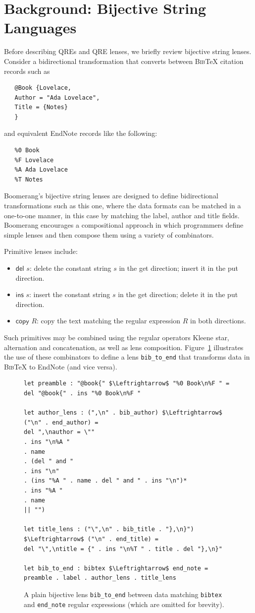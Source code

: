 \documentclass[acmsmall,screen]{acmart}
\newcommand{\kw}[1]{\textcolor{dkblue}{\ensuremath{\mathsf{#1}}}}
\newcommand{\bibtex}{\textsc{Bib}\TeX{}}
\newcommand{\cd}[1]{\lstinline[backgroundcolor=\color{white}]$#1$}
\begin{document}
\section{Background: Bijective String Languages}
\label{sec:background}
Before describing QREs and QRE lenses, we briefly review bijective
string lenses. Consider a bidirectional transformation that converts
between \bibtex{} citation records such as
\begin{verbatim}
   @Book {Lovelace,
   Author = "Ada Lovelace",
   Title = {Notes}
   }
\end{verbatim}
\noindent
and equivalent EndNote records like the following:
\begin{verbatim}
   %0 Book
   %F Lovelace
   %A Ada Lovelace
   %T Notes
\end{verbatim}
\noindent
Boomerang's bijective string lenses are designed to define bidirectional
transformations such as this one, where the data formats can be matched in a
one-to-one manner, in this case by matching the label, author and title fields.
Boomerang encourages a compositional approach in which programmers
define simple lenses and then compose them using a variety of
combinators. 

Primitive lenses include:
\begin{itemize}
  \item \kw{del} $s$: delete the constant string $s$ in the get
  direction; insert it in the put direction.
  \item \kw{ins} $s$: insert the constant string $s$ in the get
  direction; delete it in the put direction.
  \item \kw{copy} $R$: copy the text matching the regular expression $R$ in
  both directions.
\end{itemize}
Such primitives may be combined using the regular operators
Kleene star, alternation and concatenation, as well as lens composition.
Figure~\ref{fig:example-lens} illustrates the use of these
combinators to define a lens \cd{bib_to_end} that transforms data
in \bibtex{} to EndNote (and vice versa). 
\begin{figure}[t]
\begin{lstlisting}
let preamble : "@book{" $\Leftrightarrow$ "%0 Book\n%F " =
del "@book{" . ins "%0 Book\n%F "

let author_lens : (",\n" . bib_author) $\Leftrightarrow$ ("\n" . end_author) =
del ",\nauthor = \""
. ins "\n%A "
. name
. (del " and "
. ins "\n"
. (ins "%A " . name . del " and " . ins "\n")*
. ins "%A "
. name
|| "")

let title_lens : ("\",\n" . bib_title . "},\n}") $\Leftrightarrow$ ("\n" . end_title) =
del "\",\ntitle = {" . ins "\n%T " . title . del "},\n}"

let bib_to_end : bibtex $\Leftrightarrow$ end_note = preamble . label . author_lens . title_lens
\end{lstlisting}
\caption{A plain bijective lens \cd{bib_to_end} between data
matching \cd{bibtex} and \cd{end_note} regular 
expressions (which are omitted for brevity).  
}
\label{fig:example-lens}
\end{figure}
\end{document}
